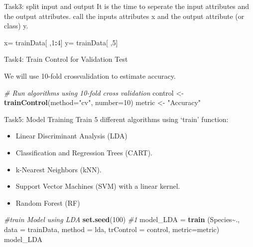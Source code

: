 \documentclass[
]{article}
\newenvironment{Shaded}{\begin{snugshade}}{\end{snugshade}}
\newcommand{\AttributeTok}[1]{\textcolor[rgb]{0.13,0.29,0.53}{#1}}
\newcommand{\CommentTok}[1]{\textcolor[rgb]{0.56,0.35,0.01}{\textit{#1}}}
\newcommand{\DecValTok}[1]{\textcolor[rgb]{0.00,0.00,0.81}{#1}}
\newcommand{\FunctionTok}[1]{\textcolor[rgb]{0.13,0.29,0.53}{\textbf{#1}}}
\newcommand{\NormalTok}[1]{#1}
\newcommand{\OtherTok}[1]{\textcolor[rgb]{0.56,0.35,0.01}{#1}}
\newcommand{\SpecialCharTok}[1]{\textcolor[rgb]{0.81,0.36,0.00}{\textbf{#1}}}
\newcommand{\StringTok}[1]{\textcolor[rgb]{0.31,0.60,0.02}{#1}}
\providecommand{\tightlist}{%
  \setlength{\itemsep}{0pt}\setlength{\parskip}{0pt}}
\begin{document}
Task3: split input and output It is the time to seperate the input
attributes and the output attributes. call the inputs attributes x and
the output attribute (or class) y.

\begin{Shaded}
\begin{Highlighting}[]
\NormalTok{x}\OtherTok{=}\NormalTok{ trainData[ ,}\DecValTok{1}\SpecialCharTok{:}\DecValTok{4}\NormalTok{]}
\NormalTok{y}\OtherTok{=}\NormalTok{ trainData[ ,}\DecValTok{5}\NormalTok{]}
\end{Highlighting}
\end{Shaded}

Task4: Train Control for Validation Test

We will use 10-fold crossvalidation to estimate accuracy.

\begin{Shaded}
\begin{Highlighting}[]
\CommentTok{\# Run algorithms using 10{-}fold cross validation}
\NormalTok{control }\OtherTok{\textless{}{-}} \FunctionTok{trainControl}\NormalTok{(}\AttributeTok{method=}\StringTok{"cv"}\NormalTok{, }\AttributeTok{number=}\DecValTok{10}\NormalTok{)}
\NormalTok{metric }\OtherTok{\textless{}{-}} \StringTok{"Accuracy"}
\end{Highlighting}
\end{Shaded}

Task5: Model Training Train 5 different algorithms using `train'
function:

\begin{itemize}
\tightlist
\item
  Linear Discriminant Analysis (LDA)
\item
  Classification and Regression Trees (CART).
\item
  k-Nearest Neighbors (kNN).
\item
  Support Vector Machines (SVM) with a linear kernel.
\item
  Random Forest (RF)
\end{itemize}

\begin{Shaded}
\begin{Highlighting}[]
\CommentTok{\#train Model using LDA}
\FunctionTok{set.seed}\NormalTok{(}\DecValTok{100}\NormalTok{)}
\CommentTok{\#1}
\NormalTok{model\_LDA }\OtherTok{=} \FunctionTok{train}\NormalTok{ (Species}\SpecialCharTok{\textasciitilde{}}\NormalTok{., }\AttributeTok{data =}\NormalTok{ trainData, }\AttributeTok{method =} \StringTok{\textquotesingle{}lda\textquotesingle{}}\NormalTok{, }\AttributeTok{trControl =}\NormalTok{ control, }\AttributeTok{metric=}\NormalTok{metric)}
\NormalTok{model\_LDA}
\end{Highlighting}
\end{Shaded}
\end{document}
